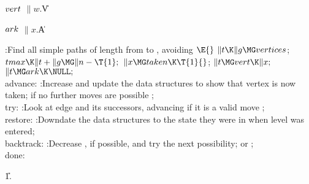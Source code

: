 \Y\B\4\D$\\{vert}$ \5
$\|w.{}$\|V\par
\B\4\D$\\{ark}$ \5
$\|x.{}$\|A\par
\Y\B\4:Find all simple paths of length  from 
to , avoiding \X${}\E{}$\6
$\|t\K\|g\MG\\{vertices}{}$;\5
${}\\{tmax}\K\|t+\|g\MG\|n-\T{1};{}$\6
${}\|x\MG\\{taken}\K\T{1}{}$;\5
${}\|t\MG\\{vert}\K\|x;{}$\6
${}\|t\MG\\{ark}\K\NULL;{}$\6
\4\\{advance}:\5
:Increase  and update the data structures to show that vertex  is now taken;  if no further moves are possible%
\X;\6
\4\\{try}:\5
:Look at edge  and its successors, advancing if it is a valid move%
\X;\6
\4\\{restore}:\5
:Downdate the data structures to the state they were in when level 
was entered\X;\6
\4\\{backtrack}:\5
:Decrease , if possible, and try the next possibility; or \X;\6
\\{done}:\par
\U1.\fi

